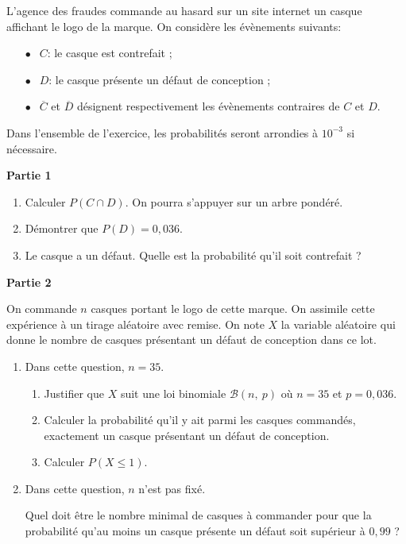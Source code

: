 \documentclass[11pt]{article}
\begin{document}
L'agence des fraudes commande au hasard sur un site internet un casque affichant le logo de la marque. On considère les évènements suivants:

\setlength\parindent{10mm}
\begin{itemize}
\item[$\bullet~~$] $C$: \og le casque est contrefait \fg{} ;
\item[$\bullet~~$] $D$: \og le casque présente un défaut de conception \fg{} ;
\item[$\bullet~~$] $\overline{C}$ et $\overline{D}$ désignent respectivement les évènements contraires de $C$ et $D$.
\end{itemize}
\setlength\parindent{0mm}

Dans l'ensemble de l'exercice, les probabilités seront arrondies à $10^{-3}$ si nécessaire.

\bigskip

\textbf{Partie 1}

\medskip

\begin{enumerate}
\item Calculer $P(C \cap D)$. On pourra s'appuyer sur un arbre pondéré.
\item Démontrer que $P(D) = 0,036$.
\item Le casque a un défaut. Quelle est la probabilité qu'il soit contrefait ?
\end{enumerate}

\bigskip

\textbf{Partie 2}

\medskip

On commande $n$ casques portant le logo de cette marque. On assimile cette expérience à
un tirage aléatoire avec remise. On note $X$ la variable aléatoire qui donne le nombre de casques présentant un défaut de conception dans ce lot.

\medskip

\begin{enumerate}
\item Dans cette question, $n = 35$.
	\begin{enumerate}
		\item Justifier que $X$ suit une loi binomiale $\mathcal{B}(n,~p)$ où $n = 35$ et $p = 0,036$.
		\item Calculer la probabilité qu'il y ait parmi les casques commandés, exactement un casque présentant un défaut de conception.
		\item Calculer $P(X \leqslant 1)$.
	\end{enumerate}	
\item Dans cette question, $n$ n'est pas fixé.

Quel doit être le nombre minimal de casques à commander pour que la probabilité 
 qu'au moins un casque présente un défaut soit supérieur à $0,99$ ?
\end{enumerate}
\end{document}
